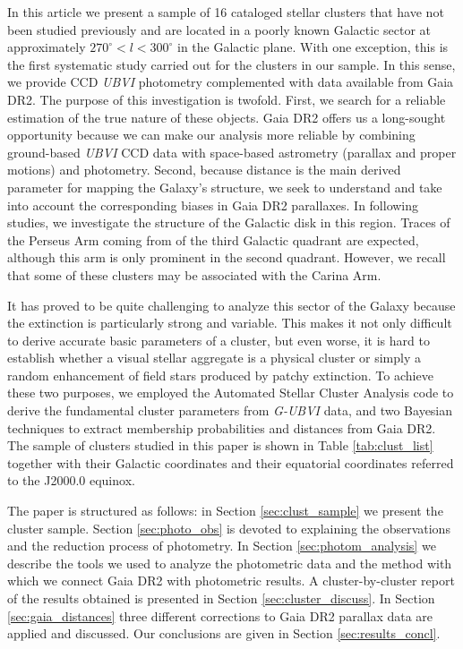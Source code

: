 \documentclass[draft]{aa}
\begin{document}
In this article we present a sample of 16 cataloged stellar clusters
\citep{Dias_2002} that have not been studied previously and are located in a
poorly known Galactic sector at approximately $270^\circ<l<300^\circ$ in the
Galactic plane. With one exception, this is the first systematic study carried
out for the clusters in our sample. In this
sense, we provide CCD \textit{UBVI} photometry complemented with data available
from Gaia DR2. The purpose of this investigation is twofold. First, we search
for a reliable estimation of the true nature of these objects. Gaia DR2 offers
us a long-sought opportunity because we can make our analysis more reliable by
combining  ground-based \textit{UBVI} CCD data with space-based astrometry 
(parallax and proper motions) and photometry. Second, because distance is the
main derived parameter for mapping the Galaxy’s structure, we seek to
understand and take
into account the corresponding biases in Gaia DR2 parallaxes.
In following studies, we investigate the structure of the
Galactic disk in this region. Traces of the Perseus Arm coming from of the
third Galactic quadrant  are expected, although this arm is only
prominent in the second quadrant. However, we recall 
that some of these clusters may be associated with the Carina Arm.

It has proved to be quite challenging to analyze this sector of the Galaxy because the extinction is particularly strong and variable. This
makes it not only difficult to derive accurate basic parameters of a cluster,
but even worse, it is hard to establish whether a visual stellar aggregate is a physical
cluster or simply a random enhancement of field stars produced by patchy
extinction. 
%
To achieve these two purposes, we employed the Automated Stellar
Cluster Analysis code \citep[\texttt{ASteCA};][]{Perren_2015} to derive
the fundamental cluster parameters from \textit{G-UBVI} data, and two Bayesian
techniques to extract membership probabilities and distances from Gaia DR2. The
sample of clusters studied in this paper is shown in Table 
\ref{tab:clust_list} together with their Galactic coordinates and their
equatorial coordinates referred to the J2000.0 equinox.

The paper is structured as follows: in Section \ref{sec:clust_sample} we
present the cluster sample.
Section \ref{sec:photo_obs} is devoted to explaining the observations and the
reduction process of photometry. In Section \ref{sec:photom_analysis} we
describe the tools we used to analyze the photometric data and the method with which we connect
Gaia DR2 with photometric results. A cluster-by-cluster report of the results
obtained is presented in Section \ref{sec:cluster_discuss}. In Section
\ref{sec:gaia_distances} three different corrections to Gaia DR2 parallax
data are applied and discussed. Our conclusions are given in Section 
\ref{sec:results_concl}.
\end{document}
